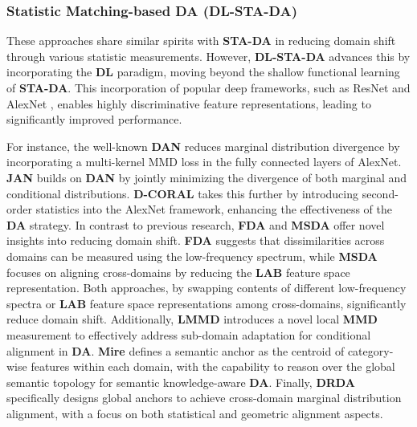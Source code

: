 \subsubsection{Statistic Matching-based DA \textbf{(DL-STA-DA)}}
\label{Statistic matching-based DA}



 {These approaches share similar spirits  with \textbf{STA-DA} in reducing domain shift through various statistic measurements. However, \textbf{DL-STA-DA} advances this by incorporating the \textbf{DL} paradigm, moving beyond the shallow functional learning of \textbf{STA-DA}. This incorporation of popular deep frameworks, such as ResNet \cite{He2015} and AlexNet \cite{krizhevsky2012imagenet}, enables highly discriminative feature representations, leading to significantly improved performance.}





 {For instance, the well-known \textbf{DAN} \cite{long2015learning} reduces marginal distribution divergence by incorporating a multi-kernel MMD loss in the fully connected layers of AlexNet. \textbf{JAN} \cite{DBLP:conf/icml/LongZ0J17} builds on \textbf{DAN} by jointly minimizing the divergence of both marginal and conditional distributions. \textbf{D-CORAL} \cite{sun2016deep} takes this further by introducing second-order statistics into the AlexNet \cite{krizhevsky2012imagenet} framework, enhancing the effectiveness of the \textbf{DA} strategy. In contrast to previous research, \textbf{FDA} \cite{yang2020fda} and \textbf{MSDA} \cite{he2021multi} offer novel insights into reducing domain shift. \textbf{FDA} suggests that dissimilarities across domains can be measured using the low-frequency spectrum, while \textbf{MSDA} focuses on aligning cross-domains by reducing the \textbf{LAB} feature space representation. Both approaches, by swapping contents of different low-frequency spectra \cite{yang2020fda} or \textbf{LAB} feature space representations \cite{he2021multi} among cross-domains, significantly reduce domain shift. Additionally, \textbf{LMMD} \cite{zhu2020deep} introduces a novel local \textbf{MMD} measurement to effectively address sub-domain adaptation for conditional alignment in \textbf{DA}. \textbf{Mire} \cite{DBLP:conf/nips/ChenT0Z0Y22} defines a semantic anchor as the centroid of category-wise features within each domain, with the capability to reason over the global semantic topology for semantic knowledge-aware \textbf{DA}. Finally, \textbf{DRDA} \cite{DBLP:journals/tip/HuangWCZZ23} specifically designs global anchors to achieve cross-domain marginal distribution alignment, with a focus on both statistical and geometric alignment aspects.}



